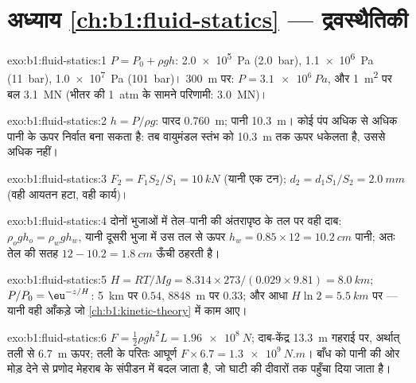 \section*{अध्याय \ref{ch:b1:fluid-statics} --- द्रवस्थैतिकी}

\begin{solution}{exo:b1:fluid-statics:1}
$P = P_0 + \rho gh$: \qty{2.0e5}{Pa} (\qty{2.0}{bar}), \qty{1.1e6}{Pa}
(\qty{11}{bar}), \qty{1.0e7}{Pa} (\qty{101}{bar})। \qty{300}{m} पर: $P =
\qty{3.1e6}{Pa}$, और \qty{1}{m^2} पर बल \qty{3.1}{MN} (भीतर की \qty{1}{atm}
के सामने परिणामी: \qty{3.0}{MN})।
\end{solution}

\begin{solution}{exo:b1:fluid-statics:2}
$h = P/\rho g$: पारद \qty{0.760}{m}; पानी \qty{10.3}{m}। कोई पंप अधिक से
अधिक पानी के ऊपर निर्वात बना सकता है: तब वायुमंडल स्तंभ को \qty{10.3}{m}
तक ऊपर धकेलता है, उससे अधिक नहीं।
\end{solution}

\begin{solution}{exo:b1:fluid-statics:3}
$F_2 = F_1S_2/S_1 = \qty{10}{kN}$ (यानी एक टन); $d_2 = d_1S_1/S_2 = \qty{2.0}{mm}$
(वही आयतन हटा, वही कार्य)।
\end{solution}

\begin{solution}{exo:b1:fluid-statics:4}
दोनों भुजाओं में तेल--पानी की अंतरापृष्ठ के तल पर वही दाब: $\rho_og
h_o = \rho_wgh_w$, यानी दूसरी भुजा में उस तल से ऊपर $h_w = 0.85 \times 12 = \qty{10.2}{cm}$
पानी; अतः तेल की सतह $12 - 10.2 = \qty{1.8}{cm}$ ऊँची
ठहरती है।
\end{solution}

\begin{solution}{exo:b1:fluid-statics:5}
$H = RT/Mg = 8.314 \times 273/(0.029 \times 9.81) = \qty{8.0}{km}$; $P/P_0 =
\eu^{-z/H}$: \qty{5}{km} पर $0.54$, \qty{8848}{m} पर $0.33$; और आधा $H\ln2 =
\qty{5.5}{km}$ पर --- यानी वही आँकड़े जो \cref{ch:b1:kinetic-theory} में काम आए।
\end{solution}

\begin{solution}{exo:b1:fluid-statics:6}
$F = \tfrac12\rho gh^2L = \qty{1.96e8}{N}$; दाब-केंद्र \qty{13.3}{m} गहराई पर,
अर्थात् तली से \qty{6.7}{m} ऊपर; तली के परितः आघूर्ण $F \times
6.7 = \qty{1.3e9}{N.m}$। बाँध को पानी की ओर मोड़ देने से प्रणोद मेहराब के
संपीडन में बदल जाता है, जो घाटी की दीवारों तक पहुँचा दिया जाता है।
\end{solution}

